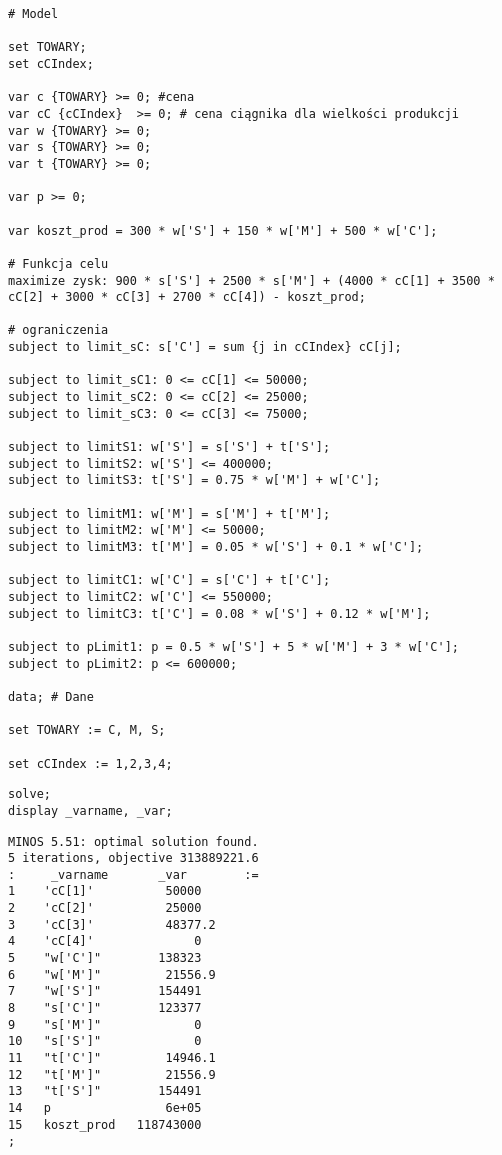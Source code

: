 \documentclass{article}
\begin{document}
\lstset{language=AMPL}
\begin{lstlisting}[caption={Model napisany w języku AMPL},label=DescriptiveLabel]
# Model

set TOWARY;
set cCIndex;

var c {TOWARY} >= 0; #cena
var cC {cCIndex}  >= 0; # cena ciągnika dla wielkości produkcji
var w {TOWARY} >= 0;
var s {TOWARY} >= 0;
var t {TOWARY} >= 0;

var p >= 0;

var koszt_prod = 300 * w['S'] + 150 * w['M'] + 500 * w['C'];

# Funkcja celu
maximize zysk: 900 * s['S'] + 2500 * s['M'] + (4000 * cC[1] + 3500 * cC[2] + 3000 * cC[3] + 2700 * cC[4]) - koszt_prod;

# ograniczenia
subject to limit_sC: s['C'] = sum {j in cCIndex} cC[j];

subject to limit_sC1: 0 <= cC[1] <= 50000;
subject to limit_sC2: 0 <= cC[2] <= 25000;
subject to limit_sC3: 0 <= cC[3] <= 75000;

subject to limitS1: w['S'] = s['S'] + t['S'];
subject to limitS2: w['S'] <= 400000;
subject to limitS3: t['S'] = 0.75 * w['M'] + w['C'];

subject to limitM1: w['M'] = s['M'] + t['M'];
subject to limitM2: w['M'] <= 50000;
subject to limitM3: t['M'] = 0.05 * w['S'] + 0.1 * w['C'];

subject to limitC1: w['C'] = s['C'] + t['C'];
subject to limitC2: w['C'] <= 550000;
subject to limitC3: t['C'] = 0.08 * w['S'] + 0.12 * w['M'];

subject to pLimit1: p = 0.5 * w['S'] + 5 * w['M'] + 3 * w['C'];
subject to pLimit2: p <= 600000;

data; # Dane

set TOWARY := C, M, S;

set cCIndex := 1,2,3,4;
\end{lstlisting}

\lstset{language=BASH}
\begin{lstlisting}[caption={Komendy uruchamiające solver na stronie https://ampl.com/cgi-bin/ampl/amplcgi},label=DescriptiveLabel]
solve;
display _varname, _var;
\end{lstlisting}

\lstset{language=BASH}
\begin{lstlisting}[caption={Wynik solwera},label=DescriptiveLabel]
MINOS 5.51: optimal solution found.
5 iterations, objective 313889221.6
:     _varname       _var        :=
1    'cC[1]'          50000
2    'cC[2]'          25000
3    'cC[3]'          48377.2
4    'cC[4]'              0
5    "w['C']"        138323
6    "w['M']"         21556.9
7    "w['S']"        154491
8    "s['C']"        123377
9    "s['M']"             0
10   "s['S']"             0
11   "t['C']"         14946.1
12   "t['M']"         21556.9
13   "t['S']"        154491
14   p                6e+05
15   koszt_prod   118743000
;
\end{lstlisting}
\end{document}
